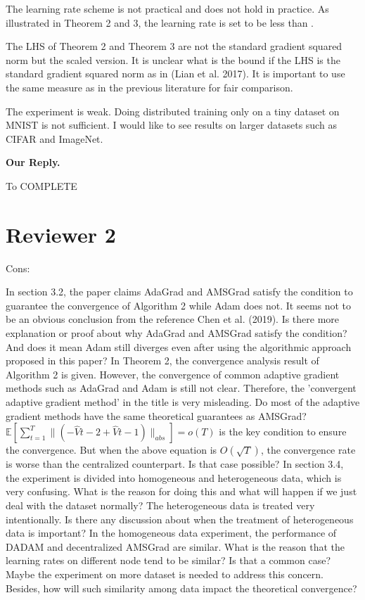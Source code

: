 \documentclass{article} %
\begin{document}
The learning rate scheme is not practical and does not hold in practice. As illustrated in Theorem 2 and 3, the learning rate  is set to be less than .

The LHS of Theorem 2 and Theorem 3 are not the standard gradient squared norm but the scaled version. It is unclear what is the bound if the LHS is the standard gradient squared norm as in (Lian et al. 2017). It is important to use the same measure as in the previous literature for fair comparison.

The experiment is weak. Doing distributed training only on a tiny dataset on MNIST is not sufficient. I would like to see results on larger datasets such as CIFAR and ImageNet.

\textbf{Our Reply.}

To COMPLETE




\section{Reviewer 2}
\vspace{-0.1in}

Cons:

In section 3.2, the paper claims AdaGrad and AMSGrad satisfy the condition to guarantee the convergence of Algorithm 2 while Adam does not. It seems not to be an obvious conclusion from the reference Chen et al. (2019). Is there more explanation or proof about why AdaGrad and AMSGrad satisfy the condition? And does it mean Adam still diverges even after using the algorithmic approach proposed in this paper?
In Theorem 2, the convergence analysis result of Algorithm 2 is given. However, the convergence of common adaptive gradient methods such as AdaGrad and Adam is still not clear. Therefore, the 'convergent adaptive gradient method' in the title is very misleading. Do most of the adaptive gradient methods have the same theoretical guarantees as AMSGrad?
$ \mathbb{E}[\sum_{t=1}^T \lVert (-\hat{V}{t-2} + \hat{V}{t-1}) \rVert_{abs}] = o(T)$ is the key condition to ensure the convergence. But when the above equation is $O(\sqrt{T})$, the convergence rate is worse than the centralized counterpart. Is that case possible?
In section 3.4, the experiment is divided into homogeneous and heterogeneous data, which is very confusing. What is the reason for doing this and what will happen if we just deal with the dataset normally? The heterogeneous data is treated very intentionally. Is there any discussion about when the treatment of heterogeneous data is important?
In the homogeneous data experiment, the performance of DADAM and decentralized AMSGrad are similar. What is the reason that the learning rates on different node tend to be similar? Is that a common case? Maybe the experiment on more dataset is needed to address this concern. Besides, how will such similarity among data impact the theoretical convergence?
\end{document}
